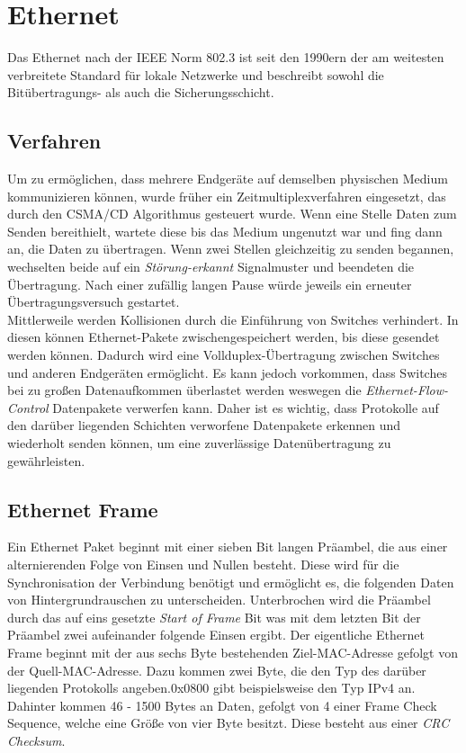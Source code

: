 \section{Ethernet}

Das Ethernet nach der IEEE Norm 802.3 ist seit den 1990ern der am weitesten verbreitete Standard für lokale Netzwerke und beschreibt sowohl die Bitübertragungs- als auch die Sicherungsschicht. \\
\subsection{Verfahren}
Um zu ermöglichen, dass mehrere Endgeräte auf demselben physischen Medium kommunizieren können, wurde früher ein Zeitmultiplexverfahren eingesetzt, das durch den CSMA/CD Algorithmus gesteuert wurde. Wenn eine Stelle Daten zum Senden bereithielt, wartete diese bis das Medium ungenutzt war und fing dann an, die Daten zu übertragen. Wenn zwei Stellen gleichzeitig zu senden begannen, wechselten beide auf ein \textit{Störung-erkannt} Signalmuster und beendeten die Übertragung. Nach einer zufällig langen Pause würde jeweils ein erneuter Übertragungsversuch gestartet.\\
Mittlerweile werden Kollisionen durch die Einführung von Switches verhindert. In diesen können Ethernet-Pakete zwischengespeichert werden, bis diese gesendet werden können. Dadurch wird eine Vollduplex-Übertragung zwischen Switches und anderen Endgeräten ermöglicht. Es kann jedoch vorkommen, dass Switches bei zu großen Datenaufkommen überlastet werden weswegen die \textit{Ethernet-Flow-Control} Datenpakete verwerfen kann. Daher ist es wichtig, dass Protokolle auf den darüber liegenden Schichten verworfene Datenpakete erkennen und wiederholt senden können, um eine zuverlässige Datenübertragung zu gewährleisten. 

\subsection{Ethernet Frame}

Ein Ethernet Paket beginnt mit einer sieben Bit langen Präambel, die aus einer alternierenden Folge von Einsen und Nullen besteht. Diese wird für die Synchronisation der Verbindung benötigt und ermöglicht es, die folgenden Daten von Hintergrundrauschen zu unterscheiden. Unterbrochen wird die Präambel durch das auf eins gesetzte \textit{Start of Frame} Bit was mit dem letzten Bit der Präambel zwei aufeinander folgende Einsen ergibt. 
Der eigentliche Ethernet Frame beginnt mit der aus sechs Byte bestehenden Ziel-MAC-Adresse gefolgt von der Quell-MAC-Adresse. 
Dazu kommen zwei Byte, die den Typ des darüber liegenden Protokolls angeben.0x0800 gibt beispielsweise den Typ IPv4 an. Dahinter kommen 46 - 1500 Bytes an Daten, gefolgt von 4 einer Frame Check Sequence, welche eine Größe von vier Byte besitzt. Diese besteht aus einer  \textit{CRC Checksum}. 



